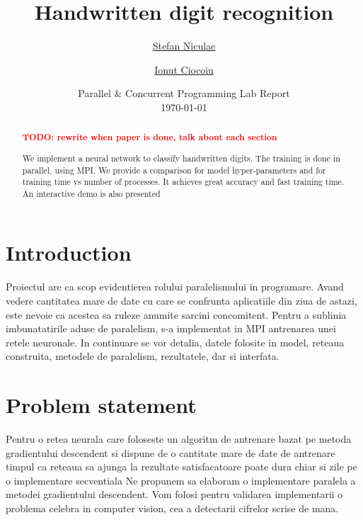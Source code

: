 \documentclass[a4paper]{article}
\newcommand{\TODO}[1]{\noindent \textbf{\textcolor{red}{TODO: #1}}}
\begin{document}
	\title{
	\Huge Handwritten digit recognition
	}
	
	\vspace{2cm}
	
	\author{\Large \href{mailto:stefan.niculae@my.fmi.unibuc.ro}{Stefan Niculae} \and \Large \href{mailto:ionut.ciocoiu@my.fmi.unibuc.ro}{Ionut Ciocoiu}
	\vspace{3cm}}
	
	\date{
	\large Parallel \& Concurrent Programming Lab Report \\
    \vspace{0.2cm}
	\today
	}

	\maketitle

\vspace{5cm}
\begin{abstract}
\TODO{rewrite when paper is done, talk about each section}

We implement a neural network to classify handwritten digits. The training is done in parallel, using MPI. We provide a comparison for model hyper-parameters and for training time vs number of processes. It achieves great accuracy and fast training time. An interactive demo is also presented
\end{abstract}






\newpage
\section{Introduction}
Proiectul are ca scop evidentierea rolului paralelismului in programare. Avand vedere cantitatea mare de date cu care se confrunta aplicatiile din ziua de astazi, este nevoie ca acestea sa ruleze anumite sarcini concomitent. Pentru a sublinia imbunatatirile aduse de paralelism, s-a implementat in MPI antrenarea unei retele neuronale. In continuare se vor detalia, datele folosite in model, reteaua construita, metodele de paralelism, rezultatele, dar si interfata.

\section{Problem statement}
\label{sec:problem}
Pentru o retea neurala care foloseste un algoritm de antrenare bazat pe metoda gradientului descendent si dispune de o cantitate mare de date de antrenare timpul ca reteaua sa ajunga la rezultate satisfacatoare poate dura chiar si zile pe o implementare secventiala
Ne propunem sa elaboram o implementare paralela a metodei gradientului descendent. Vom folosi pentru validarea implementarii o problema celebra in computer vision, cea a detectarii cifrelor scrise de mana.
\end{document}

